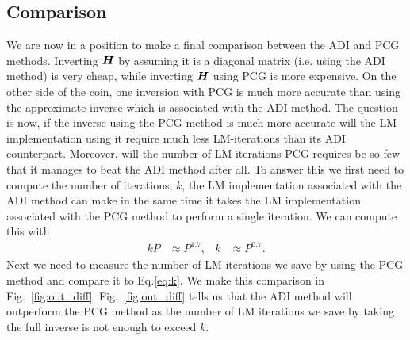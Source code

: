 \documentclass[useAMS,usenatbib]{mn2e}
\newcommand{\bH}{\bmath{H}}
\begin{document}
\subsection{Comparison}
\label{sec:comparison}
We are now in a position to make a final comparison between the ADI and PCG methods. Inverting $\bH$ by assuming it is a diagonal matrix (i.e. using the ADI method) is very cheap, while inverting $\bH$ using PCG is more expensive. On the other side of the coin,  one inversion with PCG is much more 
accurate than using the approximate inverse which is associated with the ADI method. The question is now, if the inverse using the PCG method is much more accurate will the LM implementation using it require much less LM-iterations than its ADI counterpart. Moreover, will the number 
of LM iterations PCG requires be so few that it manages to beat the ADI method after all. To answer this we first need to compute the number of iterations, $k$, the LM implementation associated with the ADI method can make in the 
same time it takes the LM implementation associated with the PCG method to perform a single iteration. We can compute this with
\begin{align}
\label{eq:k}
 kP &\approx P^{1.7}, & k &\approx P^{0.7}.
\end{align}
Next we need to measure the number of LM iterations we save by using the PCG method and compare it to Eq.\eqref{eq:k}. We make this comparison 
in Fig.~\ref{fig:out_diff}. Fig.~\ref{fig:out_diff} tells us that the ADI method will outperform the PCG method as the number of LM iterations we save by taking the 
full inverse is not enough to exceed $k$.
\end{document}
